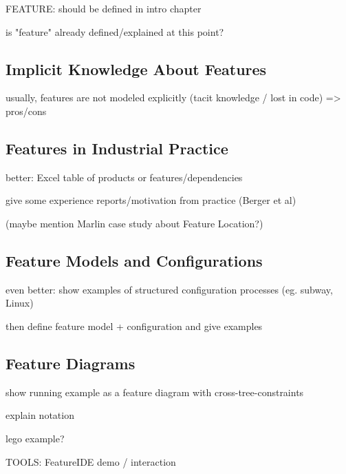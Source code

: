 FEATURE: should be defined in intro chapter

is "feature" already defined/explained at this point?

\subsection{Implicit Knowledge About Features}

usually, features are not modeled explicitly (tacit knowledge / lost in code) => pros/cons

\subsection{Features in Industrial Practice}

better: Excel table of products or features/dependencies

give some experience reports/motivation from practice (Berger et al)

(maybe mention Marlin case study about Feature Location?)

\subsection{Feature Models and Configurations}

even better: show examples of structured configuration processes (eg. subway, Linux)

then define feature model + configuration and give examples

\subsection{Feature Diagrams}

show running example as a feature diagram with cross-tree-constraints

explain notation

lego example?


TOOLS: FeatureIDE demo / interaction